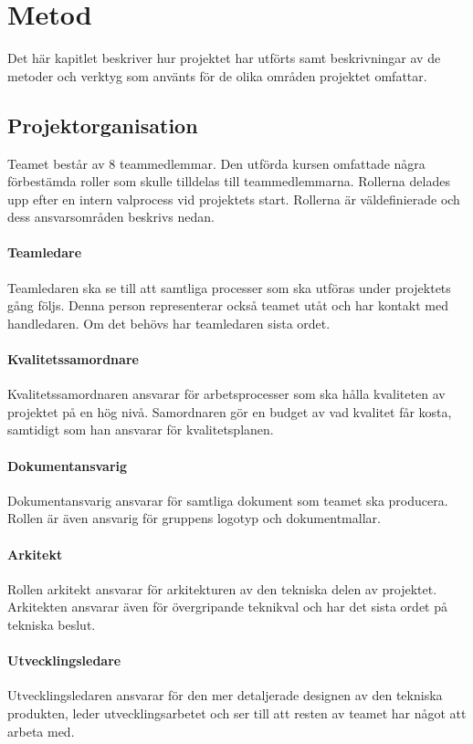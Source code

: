 \chapter{Metod}
\label{cha:method}
Det här kapitlet beskriver hur projektet har utförts samt beskrivningar av de metoder och verktyg som använts för de olika områden projektet omfattar.

\section{Projektorganisation}
Teamet består av 8 teammedlemmar. Den utförda kursen omfattade några förbestämda roller som skulle tilldelas till teammedlemmarna. Rollerna delades upp efter en intern valprocess vid projektets start. Rollerna är väldefinierade och dess ansvarsområden beskrivs nedan.

\subsubsection*{Teamledare}
Teamledaren ska se till att samtliga processer som ska utföras under projektets gång följs. Denna person representerar också teamet utåt och har kontakt med handledaren. Om det behövs har teamledaren sista ordet.

\subsubsection*{Kvalitetssamordnare}
Kvalitetssamordnaren ansvarar för arbetsprocesser som ska hålla kvaliteten av projektet på en hög nivå. Samordnaren gör en budget av vad kvalitet får kosta, samtidigt som han ansvarar för kvalitetsplanen.

\subsubsection*{Dokumentansvarig}
Dokumentansvarig ansvarar för samtliga dokument som teamet ska producera. Rollen är även ansvarig för gruppens logotyp och dokumentmallar.

\subsubsection*{Arkitekt}
Rollen arkitekt ansvarar för arkitekturen av den tekniska delen av projektet. Arkitekten ansvarar även för övergripande teknikval och har det sista ordet på tekniska beslut.

\subsubsection*{Utvecklingsledare}
Utvecklingsledaren ansvarar för den mer detaljerade designen av den tekniska produkten, leder utvecklingsarbetet och ser till att resten av teamet har något att arbeta med.


